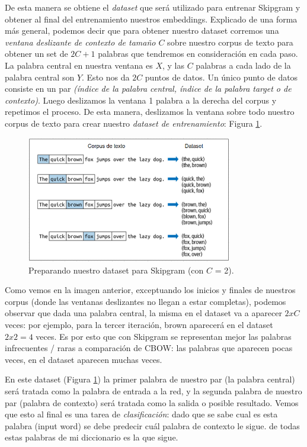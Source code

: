 \documentclass[12pt,a4paper]{article}
\begin{document}
\begin{sloppypar}
De esta manera se obtiene el \textit{dataset} que será utilizado para entrenar Skipgram y obtener al final del entrenamiento nuestros embeddings. Explicado de una forma más general, podemos decir que para obtener nuestro dataset corremos una \textit{ventana deslizante de contexto de tamaño $C$} sobre nuestro corpus de texto para obtener un set de $2C+1$ palabras que tendremos en consideración en cada paso. La palabra central en nuestra ventana es $X$, y las $C$ palabras a cada lado de la palabra central son $Y$. Esto nos da $2C$ puntos de datos. Un único punto de datos consiste en un par \textit{(índice de la palabra central, índice de la palabra target o de contexto)}. Luego deslizamos la ventana 1 palabra a la derecha del corpus y repetimos el proceso. De esta manera, deslizamos la ventana sobre todo nuestro corpus de texto para crear nuestro \textit{dataset de entrenamiento}: Figura \ref{fig:Imagen_NLP_21}. 

\begin{figure}[H]    
 \centering
 \includegraphics[width=0.8\textwidth]{images/NLP/21.png}
 \captionsetup{justification=centering,margin=4cm}
 \caption{Preparando nuestro dataset para Skipgram (con $C$ = 2)\cite{NLP_26}.}
 \label{fig:Imagen_NLP_21}
\end{figure}

Como vemos en la imagen anterior, exceptuando los inicios y finales de nuestros corpus (donde las ventanas deslizantes no llegan a estar completas), podemos observar que dada una palabra central, la misma en el dataset va a aparecer $2xC$ veces: por ejemplo, para la tercer iteración, brown aparecerá en el dataset $2x2=4$ veces. Es por esto que con Skipgram se representan mejor las palabras infrecuentes / raras a comparación de CBOW: las palabras que aparecen pocas veces, en el dataset aparecen muchas veces.

En este dataset (Figura \ref{fig:Imagen_NLP_21}) la primer palabra de nuestro par (la palabra central) será tratada como la palabra de entrada a la red, y la segunda palabra de nuestro par (palabra de contexto) será tratada como la salida o posible resultado. Vemos que esto al final es una tarea de \textit{clasificación}: dado que se sabe cual es esta palabra (input word) se debe predecir cuál palabra de contexto le sigue. de todas estas palabras de mi diccionario es la que sigue. 


\end{sloppypar}
\end{document}
